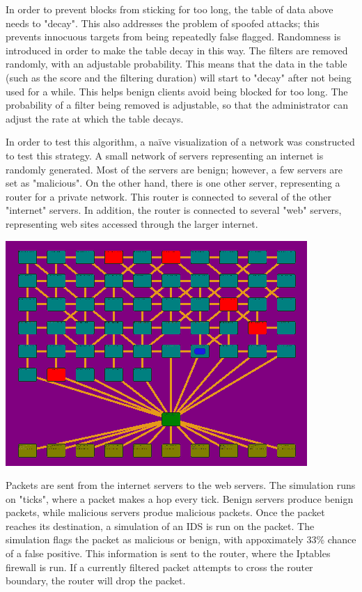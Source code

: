 \documentclass[12pt]{article}
\begin{document}
\begin{flushleft}
\begin{multicols}{2}
In order to prevent blocks from sticking for too long, the table of data above needs to "decay". This also addresses the problem of spoofed attacks; this prevents innocuous targets from being repeatedly false flagged. Randomness is introduced in order to make the table decay in this way. The filters are removed randomly, with an adjustable probability. This means that the data in the table (such as the score and the filtering duration) will start to "decay" after not being used for a while. This helps benign clients avoid being blocked for too long. The probability of a filter being removed is adjustable, so that the administrator can adjust the rate at which the table decays.

In order to test this algorithm, a na\"{i}ve visualization of a network was constructed to test this strategy. A small network of servers representing an internet is randomly generated. Most of the servers are benign; however, a few servers are set as "malicious". On the other hand, there is one other server, representing a router for a private network. This router is connected to several of the other "internet" servers. In addition, the router is connected to several "web" servers, representing web sites accessed through the larger internet.

\includegraphics[scale=0.5]{cs-653-networksim.png}

Packets are sent from the internet servers to the web servers. The simulation runs on "ticks", where a packet makes a hop every tick. Benign servers produce benign packets, while malicious servers produe malicious packets. Once the packet reaches its destination, a simulation of an IDS is run on the packet. The simulation flags the packet as malicious or benign, with appoximately 33\% chance of a false positive. This information is sent to the router, where the Iptables firewall is run. If a currently filtered packet attempts to cross the router boundary, the router will drop the packet.


\end{multicols}
\end{flushleft}
\end{document}
